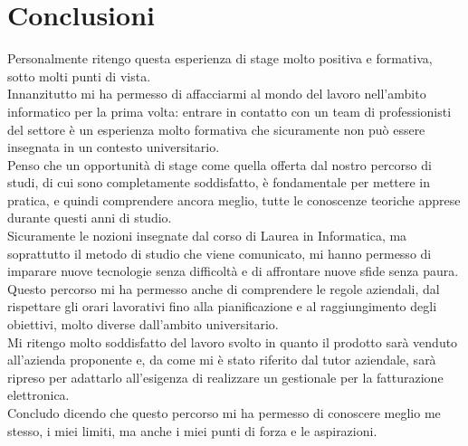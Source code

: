 \section{Conclusioni}
Personalmente ritengo questa esperienza di stage molto positiva e formativa, sotto
molti punti di vista.
\\
Innanzitutto mi ha permesso di affacciarmi al mondo del lavoro nell'ambito informatico per la prima volta: entrare in contatto con un team di professionisti del settore è un esperienza molto formativa che sicuramente non può essere insegnata in un contesto universitario. 
\\
Penso che un opportunità di stage come quella offerta dal nostro percorso di studi, di cui sono completamente soddisfatto, è fondamentale per mettere in pratica, e quindi comprendere ancora meglio, tutte le conoscenze teoriche apprese durante questi anni di studio.
\\
Sicuramente le nozioni insegnate dal corso di Laurea in Informatica, ma soprattutto il metodo di studio che viene comunicato, mi hanno permesso di imparare nuove tecnologie senza difficoltà e di affrontare nuove sfide senza paura. Questo percorso mi ha permesso anche di comprendere le regole aziendali, dal rispettare gli orari lavorativi fino alla pianificazione e al raggiungimento degli obiettivi, molto diverse dall'ambito universitario.
\\
Mi ritengo molto soddisfatto del lavoro svolto in quanto il prodotto sarà venduto all'azienda proponente e, da come mi è stato riferito dal tutor aziendale, sarà ripreso per adattarlo all'esigenza di realizzare un gestionale per la fatturazione elettronica.
\\
Concludo dicendo che questo percorso mi ha permesso di conoscere meglio me stesso, i
miei limiti, ma anche i miei punti di forza e le aspirazioni.
